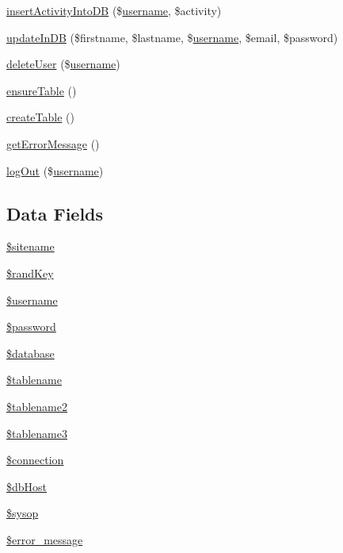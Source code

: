 \begin{DoxyCompactItemize}
\item 
\hyperlink{classdb_validator_a4559213abe578337a820686417a80e4a}{insert\-Activity\-Into\-D\-B} (\$\hyperlink{classdb_validator_a7475524fbb2e38dd6c9f7a6661b0bb81}{username}, \$activity)
\item 
\hyperlink{classdb_validator_a713bfc19a744a797703086cd9129ab97}{update\-In\-D\-B} (\$firstname, \$lastname, \$\hyperlink{classdb_validator_a7475524fbb2e38dd6c9f7a6661b0bb81}{username}, \$email, \$password)
\item 
\hyperlink{classdb_validator_a59ad157d090400bd74195d538e8655d7}{delete\-User} (\$\hyperlink{classdb_validator_a7475524fbb2e38dd6c9f7a6661b0bb81}{username})
\item 
\hyperlink{classdb_validator_af4f0dc1bf02a2f431848c6a39407a29d}{ensure\-Table} ()
\item 
\hyperlink{classdb_validator_ad3d7cd058f1bf894920970b2d69098d1}{create\-Table} ()
\item 
\hyperlink{classdb_validator_a3d24ed0e93b212b4d5e382fa795bf4ef}{get\-Error\-Message} ()
\item 
\hyperlink{classdb_validator_a7bd718e89060488236778f8a6663d1dd}{log\-Out} (\$\hyperlink{classdb_validator_a7475524fbb2e38dd6c9f7a6661b0bb81}{username})
\end{DoxyCompactItemize}
\subsection*{Data Fields}
\begin{DoxyCompactItemize}
\item 
\hyperlink{classdb_validator_ac01e858d3012ea85184c30f6f4edd45f}{\$sitename}
\item 
\hyperlink{classdb_validator_af8bd70c25fd7f3db4196748af602fdd7}{\$rand\-Key}
\item 
\hyperlink{classdb_validator_a0eb82aa5f81cf845de4b36cd653c42cf}{\$username}
\item 
\hyperlink{classdb_validator_a607686ef9f99ea7c42f4f3dd3dbb2b0d}{\$password}
\item 
\hyperlink{classdb_validator_a7691c0162d89de0b6ba47edcd8ba8878}{\$database}
\item 
\hyperlink{classdb_validator_ab55152af3e5453213c2891ba55a0c6d5}{\$tablename}
\item 
\hyperlink{classdb_validator_a8f937669214b4c9aad11cce83951fc4e}{\$tablename2}
\item 
\hyperlink{classdb_validator_ad69dcbfcc345d3a10c6f6d11ac5003a4}{\$tablename3}
\item 
\hyperlink{classdb_validator_a0d9c79b9b86b3f5891c6d3892f12c6a0}{\$connection}
\item 
\hyperlink{classdb_validator_ad0ddb2725e69c88a729e0cc242a1b2a6}{\$db\-Host}
\item 
\hyperlink{classdb_validator_a95bd2e694f2856f7f5b6e260d4f4b0d5}{\$sysop}
\item 
\hyperlink{classdb_validator_ae838cbd355959defbd4d49d0fbe7b273}{\$error\-\_\-message}
\end{DoxyCompactItemize}


